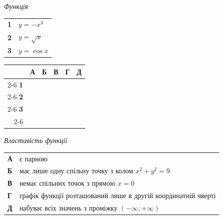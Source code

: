 \documentclass[14pt]{extarticle}
\begin{document}
\noindent
\begin{minipage}[t]{0.45\textwidth}
    \textit{Функція} \par \vspace{0.2cm}
    \begin{tabular}{@{}p{0.5cm} p{5cm}@{}}
    \textbf{1} & $y=-x^3$ \\[0.3cm]
    \textbf{2} & $y=\sqrt{x}$ \\[0.3cm]
    \textbf{3} & $y=\cos x$ \\
    \end{tabular}
    
    \vspace{0.5cm}
    
    \begingroup
    \setlength{\tabcolsep}{4pt}
    \renewcommand{\arraystretch}{1.2}
    \small
    \begin{tabular}{r|c|c|c|c|c|}
         \multicolumn{1}{c}{} & \multicolumn{1}{c}{\textbf{А}} & \multicolumn{1}{c}{\textbf{Б}} & \multicolumn{1}{c}{\textbf{В}} & \multicolumn{1}{c}{\textbf{Г}} & \multicolumn{1}{c}{\textbf{Д}} \\ \cline{2-6}
         \textbf{1} & & & & & \\ \cline{2-6}
         \textbf{2} & & & & & \\ \cline{2-6}
         \textbf{3} & & & & & \\ \cline{2-6}
    \end{tabular}
    \endgroup
\end{minipage}%
\hfill
\begin{minipage}[t]{0.50\textwidth}
    \textit{Властивість функції} \par \vspace{0.2cm}
    \begin{tabular}{@{}p{0.5cm} p{7.5cm}@{}}
    \textbf{А} & є парною \\[0.3cm]
    \textbf{Б} & має лише одну спільну точку з колом $x^2+y^2=9$ \\[0.3cm]
    \textbf{В} & немає спільних точок з прямою $x=0$ \\[0.3cm]
    \textbf{Г} & графік функції розташований лише в другій координатній чверті \\[0.3cm]
    \textbf{Д} & набуває всіх значень з проміжку $(-\infty; +\infty)$ \\
    \end{tabular}
\end{minipage}
\end{document}
